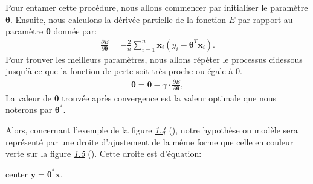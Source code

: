 \documentclass[letterpaper,11pt,english]{sphinxmanual}
\begin{document}
\sphinxAtStartPar
Pour entamer cette procédure, nous allons commencer par initialiser le
paramètre \(\boldsymbol{\theta}\). Ensuite, nous calculons la
dérivée partielle de la fonction \(E\) par rapport au paramètre
\(\boldsymbol{\theta}\) donnée par:
\begin{equation}\label{equation:chapter3:chapter3:13}
\begin{split}\frac{\partial E}{\partial \boldsymbol{\theta}} = -\frac{2}{n} \sum_{i=1}^{n} \mathbf{x}_i(y_i - \boldsymbol{\theta}^{T} \mathbf{x}_i).\end{split}
\end{equation}
\sphinxAtStartPar
Pour trouver les meilleurs paramètres, nous allons répéter le processus
ci\sphinxhyphen{}dessous jusqu’à ce que la fonction de perte soit très proche ou égale
à \(0\).
\begin{equation}\label{equation:chapter3:chapter3:14}
\begin{split}\boldsymbol{\theta} = \boldsymbol{\theta} - \gamma \cdot \frac{\partial E}{\partial \boldsymbol{\theta}},\end{split}
\end{equation}
\sphinxAtStartPar
La valeur de \(\boldsymbol{\theta}\) trouvée après convergence est
la valeur optimale que nous noterons par \(\boldsymbol{\theta}^*\).

\sphinxAtStartPar
Alors, concernant l’exemple de la figure {\hyperref[\detokenize{chapter3:exdonnee}]{\emph{1.4}}} (), notre
hypothèse ou modèle sera représenté par une droite d’ajustement de la
même forme que celle en couleur verte sur la figure
{\hyperref[\detokenize{chapter3:droitelin}]{\emph{1.5}}} (). Cette droite est d’équation:

\begin{sphinxuseclass}{center}
\sphinxAtStartPar
\(\mathbf{y} = \boldsymbol{\theta}^*\mathbf{x}\).

\end{sphinxuseclass}
\begin{DUlineblock}{0em}
\item[] 
\end{DUlineblock}
\end{document}
